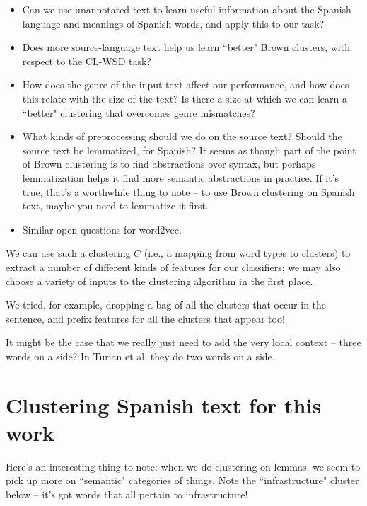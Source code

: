 \begin{itemize}
  \item Can we use unannotated text to learn useful information about the
  Spanish language and meanings of Spanish words, and apply this to our task?
  \item Does more source-language text help us learn ``better" Brown clusters,
    with respect to the CL-WSD task?
  \item How does the genre of the input text affect our performance, and how
  does this relate with the size of the text? Is there a size at which we
    can learn a ``better" clustering that overcomes genre mismatches?
  \item What kinds of preprocessing should we do on the source text? Should the
  source text be lemmatized, for Spanish? It seems as though part of the point
  of Brown clustering is to find abstractions over syntax, but perhaps
  lemmatization helps it find more semantic abstractions in practice.
  If it's true, that's a worthwhile thing to note -- to use Brown clustering on
  Spanish text, maybe you need to lemmatize it first.
  \item Similar open questions for word2vec.
\end{itemize}

We can use such a clustering $C$ (i.e., a mapping from word types to clusters)
to extract a number of different kinds of features for our classifiers;
we may also choose a variety of inputs to the clustering algorithm in the first
place.


We tried, for example, dropping a bag of all the clusters that occur in the
sentence, and prefix features for all the clusters that appear too!

It might be the case that we really just need to add the very local context --
three words on a side? In Turian et al, they do two words on a side.


\section{Clustering Spanish text for this work}


Here's an interesting thing to note: when we do clustering on lemmas, we seem
to pick up more on ``semantic" categories of things. Note the ``infrastructure"
cluster below -- it's got words that all pertain to infrastructure!

